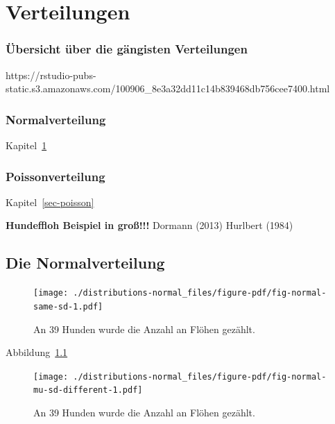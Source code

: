 \documentclass[
  letterpaper,
  DIV=11,
  oneside]{scrreport}
\begin{document}
\part{Verteilungen}

\hypertarget{uxfcbersicht-uxfcber-die-guxe4ngisten-verteilungen}{%
\section*{Übersicht über die gängisten
Verteilungen}\label{uxfcbersicht-uxfcber-die-guxe4ngisten-verteilungen}}

https://rstudio-pubs-static.s3.amazonaws.com/100906\_8e3a32dd11c14b839468db756cee7400.html

\hypertarget{normalverteilung-1}{%
\section*{Normalverteilung}\label{normalverteilung-1}}

Kapitel~\ref{sec-normal}

\hypertarget{poissonverteilung}{%
\section*{Poissonverteilung}\label{poissonverteilung}}

Kapitel~\ref{sec-poisson}

\textbf{Hundeffloh Beispiel in groß!!!} Dormann (2013) Hurlbert (1984)

\hypertarget{sec-normal}{%
\chapter{Die Normalverteilung}\label{sec-normal}}

\begin{figure}

{\centering \texttt{[image: ./distributions-normal\_files/figure-pdf/fig-normal-same-sd-1.pdf]}

}

\caption{\label{fig-normal-same-sd}An 39 Hunden wurde die Anzahl an
Flöhen gezählt.}

\end{figure}

Abbildung~\ref{fig-normal-same-sd}

\begin{figure}

{\centering \texttt{[image: ./distributions-normal\_files/figure-pdf/fig-normal-mu-sd-different-1.pdf]}

}

\caption{\label{fig-normal-mu-sd-different}An 39 Hunden wurde die Anzahl
an Flöhen gezählt.}

\end{figure}
\end{document}
